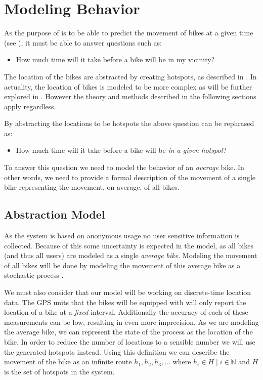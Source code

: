 \section{Modeling Behavior}\label{modelbehavior}
As the purpose of \projectname{} is to be able to predict the movement of bikes at a given time (see ), it must be able to answer questions such as: 

\begin{itemize}
\item How much time will it take before a bike will be in my vicinity?
\end{itemize}

The location of the bikes are abstracted by creating hotspots, as described in .
In actuality, the location of bikes is modeled to be more complex as will be further explored in .
However the theory and methods described in the following sections apply regardless.

By abstracting the locations to be hotspots the above question can be rephrased as: 

\begin{itemize}
\item How much time will it take before a bike will be \emph{in a given hotspot}?
\end{itemize}


To answer this question we need to model the behavior of an \emph{average} bike.
In other words, we need to provide a formal description of the movement of a single bike representing the movement, on average, of all bikes.

\subsection{Abstraction Model}
As the system is based on anonymous usage no user sensitive information is collected.
Because of this some uncertainty is expected in the model, as all bikes (and thus all users) are modeled as a single \textit{average bike}.
Modeling the movement of all bikes will be done by modeling the movement of this average bike as a stochastic process \cite{stochastic}.

We must also consider that our model will be working on discrete-time location data.
The GPS units that the bikes will be equipped with will only report the location of a bike at a \textit{fixed} interval.
Additionally the accuracy of each of these measurements can be low, resulting in even more imprecision.
As we are modeling the average bike, we can represent the state of the process as the location of the bike.
In order to reduce the number of locations to a sensible number we will use the generated hotspots instead.
Using this definition we can describe the movement of the bike as an infinite route $h_1, h_2, h_3, \dots$ where $h_i \in H \mid i \in \mathbb{N}$ and $H$ is the set of hotspots in the system.


